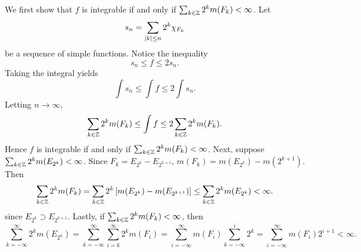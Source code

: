 \begin{pf}
    We first show that $f$ is integrable if and only if $\sum_{k\in\mathbb{Z}} 2^k m(F_k)<\infty$. 
    Let 
    \begin{equation*}
        s_n = \sum_{\left\lvert {k} \right\rvert\leq n} 2^k \chi_{F_k}
    \end{equation*}
    be a sequence of simple functions. Notice the inequality 
    \begin{equation*}
        s_n \leq f \leq 2s_n.
    \end{equation*}
    Taking the integral yields
    \begin{equation*}
        \int s_n \leq \int f \leq 2\int s_n.
    \end{equation*}
    Letting $n\to\infty$, 
    \begin{equation*}
        \sum_{k\in\mathbb{Z}} 2^k m(F_k) \leq \int f \leq 2\sum_{k\in\mathbb{Z}} 2^k m(F_k).
    \end{equation*}
    Hence $f$ is integrable if and only if $\sum_{k\in\mathbb{Z}} 2^k m(F_k)<\infty$. 
    Next, suppose $\sum_{k\in\mathbb{Z}} 2^k m(E_{2^k}) < \infty$.
    Since $F_k = E_{2^k}-E_{2^{k+1}}$, $m(F_k) = m(E_{2^k}) - m(2^{k+1})$. 
    Then 
    \begin{equation*}
        \sum_{k\in\mathbb{Z}} 2^k m(F_k) = \sum_{k\in\mathbb{Z}} 2^k \left[ {m(E_{2^k}) - m(E_{2^{k+1}})} \right] 
        \leq \sum_{k\in\mathbb{Z}} 2^k m(E_{2^k}) < \infty.
    \end{equation*}
    since $E_{2^k}\supset E_{2^{k+1}}$. 
    Lastly, if $\sum_{k\in\mathbb{Z}} 2^k m(F_k)<\infty$, then 
    \begin{equation*}
        \sum_{k=-\infty}^{\infty} 2^k m(E_{2^k}) 
        = \sum_{k=-\infty}^{\infty}\sum_{i=k}^{\infty} 2^k m(F_i) 
        = \sum_{i=-\infty}^{\infty} m(F_i) \sum_{k=-\infty}^{i} 2^k
        = \sum_{i=-\infty}^{\infty} m(F_i) 2^{i+1} < \infty.
    \end{equation*}
    
\end{pf}